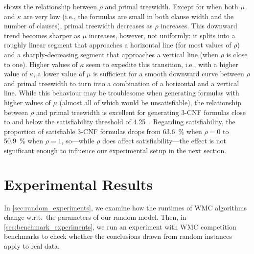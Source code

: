 \documentclass[runningheads]{llncs}
\begin{document}
 shows the relationship between $\rho$ and
primal treewidth. Except for when both $\mu$ and $\kappa$ are very low (i.e.,
the formulas are small in both clause width and the number of clauses), primal
treewidth decreases as $\rho$ increases. This downward trend becomes sharper as
$\mu$ increases, however, not uniformly: it splits into a roughly linear segment
that approaches a horizontal line (for most values of $\rho$) and a
sharply-decreasing segment that approaches a vertical line (when $\rho$ is close
to one). Higher values of $\kappa$ seem to expedite this transition, i.e., with
a higher value of $\kappa$, a lower value of $\mu$ is sufficient for a smooth
downward curve between $\rho$ and primal treewidth to turn into a combination of
a horizontal and a vertical line. While this behaviour may be troublesome when
generating formulas with higher values of $\mu$ (almost all of which would be
unsatisfiable), the relationship between $\rho$ and primal treewidth is
excellent for generating 3-CNF formulas close to and below the satisfiability
threshold of 4.25~\cite{DBLP:journals/ai/CrawfordA96}. Regarding satisfiability,
the proportion of satisfiable 3-CNF formulas drops from \SI{63.6}{\percent} when
$\rho = 0$ to \SI{50.9}{\percent} when $\rho = 1$, so---while $\rho$ does affect
satisfiability---the effect is not significant enough to influence our
experimental setup in the next section.


\section{Experimental Results}\label{sec:experiments}

In \cref{sec:random_experiments}, we examine how the runtimes of \textsf{WMC}
algorithms change w.r.t.\ the parameters of our random model. Then, in
\cref{sec:benchmark_experiments}, we run an experiment with \textsf{WMC}
competition benchmarks to check whether the conclusions drawn from random
instances apply to real data.
\end{document}
